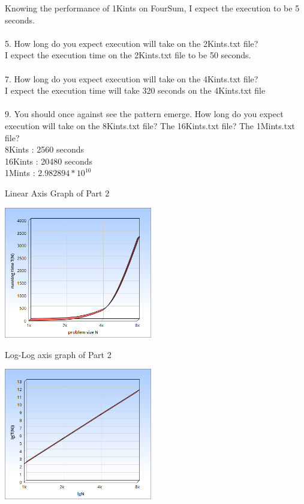 \documentclass{article}
\begin{document}
Knowing the performance of 1Kints on FourSum, I expect the execution to be 5 seconds.
\\
\\
5. How long do you expect execution will take on the 2Kints.txt file?
\\
I expect the execution time on the 2Kints.txt file to be 50 seconds.
\\
\\
7. How long do you expect execution will take on the 4Kints.txt file?
\\
I expect the execution time will take 320 seconds on the 4Kints.txt file
\\
\\
9. You should once against see the pattern emerge. How long do you expect execution will take on the 8Kints.txt file? The 16Kints.txt file? The 1Mints.txt file?
\\
8Kints : 2560 seconds
\\
16Kints : 20480 seconds
\\
1Mints : $2.982894 * 10^{10}$
\\
\newpage
\begin{center}
Linear Axis Graph of Part 2
\end{center}
\begin{center}
\includegraphics[width=6.45cm]{Part2Linear.png}
\end{center}
\begin{center}
Log-Log axis graph of Part 2
\end{center}
\begin{center}
\includegraphics[width=6.45cm]{Part2Log.png}
\end{center}
\end{document}
